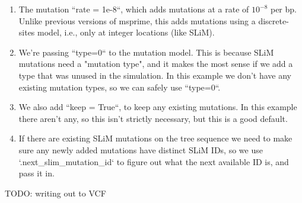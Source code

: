 \documentclass[12pt]{article}
\begin{document}
\begin{enumerate}
    \item The mutation ``rate = 1e-8``, which adds mutations at a rate of $10^{-8}$ per bp.
    Unlike previous versions of msprime, this adds mutations using a discrete-sites model,
    i.e., only at integer locations (like SLiM).

\item We're passing ``type=0`` to the mutation model.
    This is because SLiM mutations need a "mutation type",
    and it makes the most sense if we add a type that was unused in the simulation.
    In this example we don't have any existing mutation types, so we can safely use ``type=0``.

\item We also add ``keep = True``, to keep any existing mutations.
    In this example there aren't any, so this isn't strictly necessary,
    but this is a good default.

\item If there are existing SLiM mutations on the tree sequence we need to
    make sure any newly added mutations have distinct SLiM IDs,
    so we use `.next\_slim\_mutation\_id` to figure out
    what the next available ID is, and pass it in.

\end{enumerate}

TODO: writing out to VCF
\end{document}
